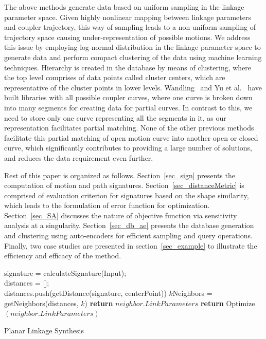 \documentclass[twocolumn,10pt]{asme2e}
\begin{document}
The above methods generate data based on uniform sampling in the linkage parameter space.
Given highly nonlinear mapping between linkage parameters and coupler trajectory, this way of sampling leads to a non-uniform sampling of trajectory space causing under-representation of possible motions.
We address this issue by employing log-normal distribution in the linkage parameter space to generate data and perform compact clustering of the data using machine learning techniques.
Hierarchy is created in the database by means of clustering, where the top level comprises of data points called cluster centers, which are representative of the cluster points in lower levels.
Wandling~\cite{wandling2000} and Yu et al.~\cite{yue-pathgen2011} have built libraries with all possible coupler curves, where one curve is broken down into many segments for creating data for partial curves.
In contrast to this, we need to store only one curve representing all the segments in it, as our representation facilitates partial matching.
None of the other previous methods facilitate this partial matching of open motion curve into another open or closed curve, which significantly contributes to providing a large number of solutions, and reduces the data requirement even further.

Rest of this paper is organized as follows. Section~\ref{sec_sign} presents the computation of motion and path signatures.
Section~\ref{sec_distanceMetric} is comprised of evaluation criterion for signatures based on the shape similarity, which leads to the formulation of error function for optimization.
Section~\ref{sec_SA} discusses the nature of objective function via sensitivity analysis at a singularity.
Section~\ref{sec_db_ae} presents the database generation and clustering using auto-encoders for efficient sampling and query operations.
Finally, two case studies are presented in section~\ref{sec_example} to illustrate the efficiency and efficacy of the method.

\begin{algorithm}
    signature = calculateSignature(Input); \\
    distances = [];\\
    {
      distances.push(getDistance(signature, centerPoint))
    }
    $k$Neighbors = getNeighbors(distances, $k$)
    {
      {
        \textbf{return} $neighbor.LinkParameters$
      }
      {
        \textbf{return} Optimize$(neighbor.LinkParameters)$
      }
    }
    \caption{Planar Linkage Synthesis}
    \label{alg_overall}
\end{algorithm}
\end{document}

